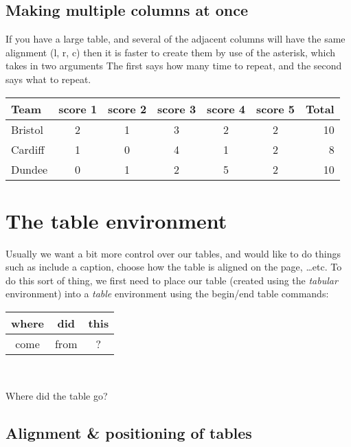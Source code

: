 \documentclass[a4paper,11pt]{article}
\begin{document}
\subsection{Making multiple columns at once}

If you have a large table, and several of the adjacent columns will have the same alignment (l, r, c) then it is faster to create them by use of the asterisk, which takes in two arguments The first says how many time to repeat, and the second says what to repeat.

\begin{tabular}{| l | *{5}{c |} r |}
	\hline
	Team    & score 1 & score 2 & score 3 & score 4 & score 5 & Total \\
	\hline \hline
	Bristol & 2       & 1       & 3       & 2       & 2       & 10    \\
	Cardiff & 1       & 0       & 4       & 1       & 2       & 8    \\
	Dundee  & 0       & 1       & 2       & 5       & 2       & 10    \\
	\hline
\end{tabular}

\pagebreak

\section{The table environment}

Usually we want a bit more control over our tables, and would like to do things such as include a caption, choose how the table is aligned on the page, \dots etc. To do this sort of thing, we first need to place our table (created using the \textit{tabular} environment) into a \textit{table} environment using the begin/end table commands:
%
\begin{table}
	\begin{tabular}{|c|c|c|}
		\hline
		where  & did   & this \\
		\hline
		come   & from  & ?    \\
		\hline
	\end{tabular}\\
\end{table}

Where did the table go?

\subsection{Alignment \& positioning of tables}
\end{document}
